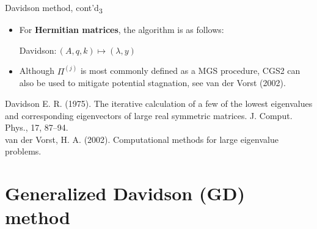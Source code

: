 \documentclass[t,usepdftitle=false]{beamer}
\begin{document}
\begin{frame}{Davidson method, cont'd\textsubscript{3}}
\begin{itemize}
\item For \textbf{Hermitian matrices}, the algorithm is as follows:\vspace{-.22cm}
\begin{algorithm}[H]
\small
\caption{Davidson$:(A,q,k)\mapsto (\lambda,y)$}
\begin{algorithmic}[1]
\ENDFOR
\end{algorithmic}
\end{algorithm}\vspace{-.35cm}
\item[] Although $\Pi^{(j)}$ is most commonly defined as a MGS procedure, CGS2 can also be used to mitigate potential stagnation, see van der Vorst (2002).
\end{itemize}\smallskip
\tiny{Davidson E. R. (1975). The iterative calculation of a few of the lowest eigenvalues and corresponding eigenvectors of large real symmetric matrices. J. Comput. Phys., 17, 87–94.}\tinyskip\\
\tiny{van der Vorst, H. A. (2002). Computational methods for large eigenvalue problems.}
\end{frame}

\section{Generalized Davidson (GD) method}
\end{document}

